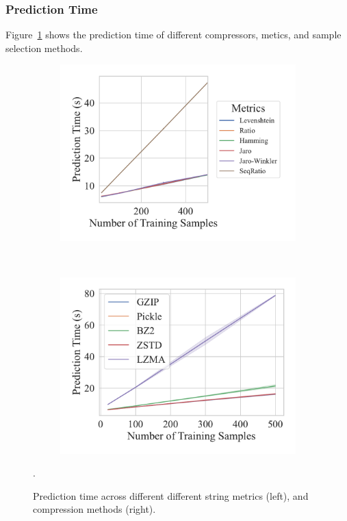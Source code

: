 \subsubsection{Prediction Time}

Figure~\ref{fig:kdd_nsl_prediction_time} shows the prediction time of different compressors, metics, and sample selection methods.
\begin{figure}[h!]
	\centering
    \captionsetup[subfigure]{skip=0pt}
	\begin{subfigure}[t]{.44\textwidth}
		\centering
		\includegraphics[width=\textwidth]{figs/kdd_nsl/string_metric_vs_predict_time.pdf}
	\end{subfigure}
	~
	\begin{subfigure}[t]{.44\textwidth}
		\centering
		\includegraphics[width=\textwidth]{figs/kdd_nsl/compressor_metric_vs_predict_time.pdf}
	\end{subfigure}
	\caption{Prediction time across different different string metrics (left), and compression methods (right).}.
	\label{fig:kdd_nsl_prediction_time}
 
\end{figure}

